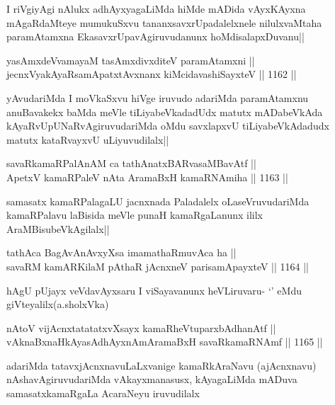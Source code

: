 \begin{artha}
I riVgiyAgi nAlukx adhAyxyagaLiMda hiMde mADida vAyxKAyxna mAgaRdaMteye mumukuSxvu tananxsavxrUpadalelxnele nilulxvaMtaha paramAtamxna EkasavxrUpavAgiruvudanunx hoMdisalapxDuvanu||
\end{artha}

\begin{shl}
yasAmxdeVvamayaM tasAmxdivxditeV paramAtamxni || \\
jecnxVyakAyaRsamApatxtAvxnanx kiMcidavashiSayxteV ||  1162 ||  
\end{shl}

\begin{artha}
yAvudariMda I moVkaSxvu hiVge iruvudo adariMda paramAtamxnu anuBavakekx baMda meVle tiLiyabeVkadadUdx matutx mADabeVkAda kAyaRvUpUNaRvAgiruvudariMda  oMdu savxlapxvU tiLiyabeVkAdadudx matutx kataRvayxvU uLiyuvudilalx||
\end{artha}

\begin{shl}
savaRkamaRPalAnAM ca tathA\s natxBARvasaMBavAtf || \\
ApetxV kamaRPaleV nAta AramaBxH kamaRNAmiha ||  1163 ||  
\end{shl}

\begin{artha}
samasatx kamaRPalagaLU jacnxnada Paladalelx oLaseVruvudariMda kamaRPalavu laBisida meVle punaH kamaRgaLanunx ililx AraMBisubeVkAgilalx||
\end{artha}

\begin{shl}
tathAca BagAvAnAvxyXsa imamathaRmuvAca ha || \\
savaRM kamARKilaM pAthaR jAcnxneV parisamApayxteV ||  1164 ||  
\end{shl}

\begin{artha}
hAgU pUjayx veVdavAyxsaru I viSayavanunx heVLiruvaru- `\stext' eMdu giVteyalilx(a.sholxVka)
\end{artha}

\begin{shl}
nAtoV vijAcnxtatatatxvXsayx kamaRheVtuparxbAdhanAtf || \\
vAknaBxnaHkAyasAdhAyxnAmAramaBxH savaRkamaRNAmf ||  1165 ||  
\end{shl}

\begin{artha}
adariMda tatavxjAcnxnavuLaLxvanige kamaRkAraNavu (ajAcnxnavu) nAshavAgiruvudariMda vAkayxmanasusx, kAyagaLiMda mADuva samasatxkamaRgaLa AcaraNeyu iruvudilalx
\end{artha}

